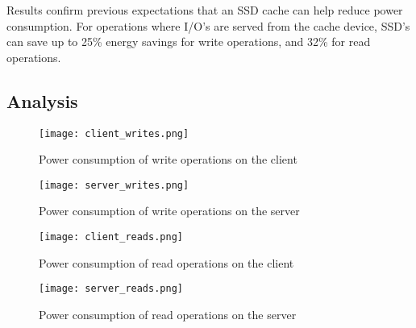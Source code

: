 Results confirm previous expectations that an SSD cache can help reduce power
consumption. For operations where I/O's are served from the cache device, SSD's
can save up to 25\% energy savings for write operations, and 32\% for read
operations.

\subsection{Analysis}

\begin{figure}[t]
  \caption{Power consumption of write operations on the client}
  \centering \texttt{[image: client\_writes.png]}
  \label{fig:client-writes}
\end{figure}

\begin{figure}[t]
  \caption{Power consumption of write operations on the server}
  \centering \texttt{[image: server\_writes.png]}
  \label{fig:server-writes}
\end{figure}

\begin{figure}[t]
  \caption{Power consumption of read operations on the client}
  \centering \texttt{[image: client\_reads.png]}
  \label{fig:client-reads}
\end{figure}

\begin{figure}[t]
  \caption{Power consumption of read operations on the server}
  \centering \texttt{[image: server\_reads.png]}
  \label{fig:server-reads}
\end{figure}

